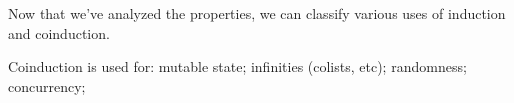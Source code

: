 Now that we've analyzed the properties, we can classify various uses
of induction and coinduction.

Coinduction is used for: mutable state; infinities (colists, etc);
randomness; concurrency;
